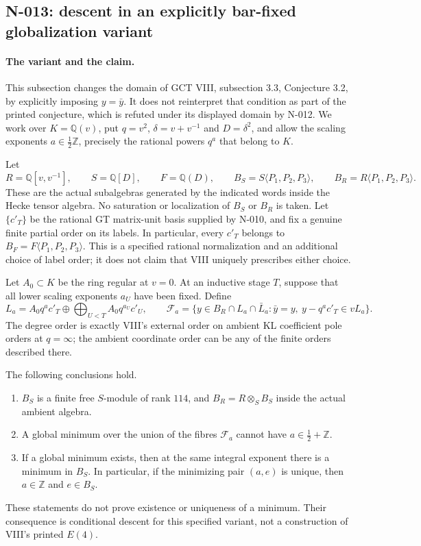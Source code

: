 \subsection{N-013: descent in an explicitly bar-fixed globalization variant}
\label{sec:nonstandard-bar-fixed-descent}

\paragraph{The variant and the claim.}
This subsection changes the domain of GCT VIII, subsection 3.3,
Conjecture 3.2, by explicitly imposing $y=\bar y$.  It does not
reinterpret that condition as part of the printed conjecture, which
is refuted under its displayed domain by N-012.  We work over
$K=\mathbb Q(v)$, put $q=v^2$, $\delta=v+v^{-1}$ and $D=\delta^2$,
and allow the scaling exponents $a\in\tfrac12\mathbb Z$, precisely
the rational powers $q^a$ that belong to $K$.

Let
\[
 R=\mathbb Q[v,v^{-1}],\qquad S=\mathbb Q[D],\qquad
 F=\mathbb Q(D),\qquad
 B_S=S\langle P_1,P_2,P_3\rangle,\qquad
 B_R=R\langle P_1,P_2,P_3\rangle.
 \tag{N-44}
\]
These are the actual subalgebras generated by the indicated words
inside the Hecke tensor algebra.  No saturation or localization
of $B_S$ or $B_R$ is taken.  Let $\{c'_T\}$ be the rational GT
matrix-unit basis supplied by N-010, and fix a genuine finite
partial order on its labels.  In particular, every $c'_T$ belongs
to $B_F=F\langle P_1,P_2,P_3\rangle$.  This is a specified rational
normalization and an additional choice of label order; it does
not claim that VIII uniquely prescribes either choice.

Let $A_0\subset K$ be the ring regular at $v=0$.  At an inductive
stage $T$, suppose that all lower scaling exponents $a_U$ have
been fixed.  Define
\[
 L_a=A_0q^ac'_T\oplus
       \bigoplus_{U<T}A_0q^{a_U}c'_U,
 \qquad
 \mathcal F_a=
 \{y\in B_R\cap L_a\cap\bar L_a:
       \bar y=y,\ y-q^ac'_T\in vL_a\}.
 \tag{N-45}
\]
The degree order is exactly VIII's external order on ambient KL
coefficient pole orders at $q=\infty$; the ambient coordinate
order can be any of the finite orders described there.

The following conclusions hold.
\begin{enumerate}
\item $B_S$ is a finite free $S$-module of rank $114$, and
      $B_R=R\otimes_S B_S$ inside the actual ambient algebra.
\item A global minimum over the union of the fibres
      $\mathcal F_a$ cannot have $a\in\tfrac12+\mathbb Z$.
\item If a global minimum exists, then at the same integral
      exponent there is a minimum in $B_S$.  In particular, if
      the minimizing pair $(a,e)$ is unique, then $a\in\mathbb Z$
      and $e\in B_S$.
\end{enumerate}
These statements do not prove existence or uniqueness of a
minimum.  Their consequence is conditional descent for this
specified variant, not a construction of VIII's printed $E(4)$.

